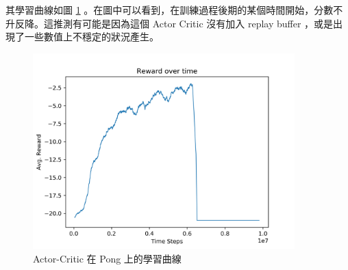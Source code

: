 \documentclass[fleqn,a4paper,12pt]{article}
\begin{document}
其學習曲線如圖 \ref{fig:learning-curve-actor-critic} 。在圖中可以看到，在訓練過程後期的某個時間開始，分數不升反降。這推測有可能是因為這個 Actor Critic 沒有加入 replay buffer ，或是出現了一些數值上不穩定的狀況產生。

\begin{figure}[h]
  \centering
  \includegraphics[width=0.9\textwidth]{figures/actor-critic.png}
  \caption{Actor-Critic 在 Pong 上的學習曲線}
  \label{fig:learning-curve-actor-critic}
\end{figure}
\end{document}
